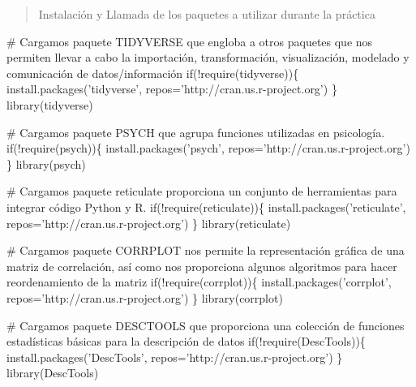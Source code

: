 \documentclass[
]{article}
\newenvironment{Shaded}{\begin{snugshade}}{\end{snugshade}}
\newcommand{\CommentTok}[1]{\textcolor[rgb]{0.50,0.62,0.50}{#1}}
\newcommand{\ControlFlowTok}[1]{\textcolor[rgb]{0.94,0.87,0.69}{#1}}
\newcommand{\DataTypeTok}[1]{\textcolor[rgb]{0.87,0.87,0.75}{#1}}
\newcommand{\KeywordTok}[1]{\textcolor[rgb]{0.94,0.87,0.69}{#1}}
\newcommand{\NormalTok}[1]{\textcolor[rgb]{0.80,0.80,0.80}{#1}}
\newcommand{\OperatorTok}[1]{\textcolor[rgb]{0.94,0.94,0.82}{#1}}
\newcommand{\StringTok}[1]{\textcolor[rgb]{0.80,0.58,0.58}{#1}}
\begin{document}
\begin{quote}
Instalación y Llamada de los paquetes a utilizar durante la práctica
\end{quote}

\begin{Shaded}
\begin{Highlighting}[]
\CommentTok{# Cargamos paquete TIDYVERSE que engloba a otros paquetes que nos permiten llevar a cabo la importación, transformación, visualización, modelado y comunicación de datos/información}
\ControlFlowTok{if}\NormalTok{(}\OperatorTok{!}\KeywordTok{require}\NormalTok{(tidyverse))\{}
    \KeywordTok{install.packages}\NormalTok{(}\StringTok{'tidyverse'}\NormalTok{, }\DataTypeTok{repos=}\StringTok{'http://cran.us.r-project.org'}\NormalTok{)}
\NormalTok{\}}
\KeywordTok{library}\NormalTok{(tidyverse)}

\CommentTok{# Cargamos paquete PSYCH que agrupa funciones  utilizadas en psicología.}
\ControlFlowTok{if}\NormalTok{(}\OperatorTok{!}\KeywordTok{require}\NormalTok{(psych))\{}
    \KeywordTok{install.packages}\NormalTok{(}\StringTok{'psych'}\NormalTok{, }\DataTypeTok{repos=}\StringTok{'http://cran.us.r-project.org'}\NormalTok{)}
\NormalTok{\}}
\KeywordTok{library}\NormalTok{(psych)}

\CommentTok{# Cargamos paquete reticulate proporciona un conjunto de  herramientas para integrar código Python y R.}
\ControlFlowTok{if}\NormalTok{(}\OperatorTok{!}\KeywordTok{require}\NormalTok{(reticulate))\{}
    \KeywordTok{install.packages}\NormalTok{(}\StringTok{'reticulate'}\NormalTok{, }\DataTypeTok{repos=}\StringTok{'http://cran.us.r-project.org'}\NormalTok{)}
\NormalTok{\}}
\KeywordTok{library}\NormalTok{(reticulate)}

\CommentTok{# Cargamos paquete CORRPLOT nos permite la representación gráfica de una matriz de correlación, así como nos proporciona algunos algoritmos para hacer reordenamiento de la matriz}
\ControlFlowTok{if}\NormalTok{(}\OperatorTok{!}\KeywordTok{require}\NormalTok{(corrplot))\{}
    \KeywordTok{install.packages}\NormalTok{(}\StringTok{'corrplot'}\NormalTok{, }\DataTypeTok{repos=}\StringTok{'http://cran.us.r-project.org'}\NormalTok{)}
\NormalTok{\}}
\KeywordTok{library}\NormalTok{(corrplot)}

\CommentTok{# Cargamos paquete DESCTOOLS que proporciona una colección de funciones estadísticas básicas para la descripción de datos}
\ControlFlowTok{if}\NormalTok{(}\OperatorTok{!}\KeywordTok{require}\NormalTok{(DescTools))\{}
    \KeywordTok{install.packages}\NormalTok{(}\StringTok{'DescTools'}\NormalTok{, }\DataTypeTok{repos=}\StringTok{'http://cran.us.r-project.org'}\NormalTok{)}
\NormalTok{\}}
\KeywordTok{library}\NormalTok{(DescTools)}


\end{Highlighting}
\end{Shaded}
\end{document}
